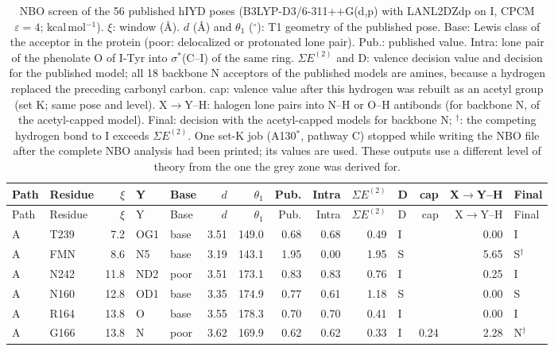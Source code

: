 \documentclass[journal=jcisd8,manuscript=suppinfo]{achemso}
\begin{document}
\begin{singlespace}
{\scriptsize
\setlength{\tabcolsep}{3pt}
\begin{longtable}{llrllrrrrrlrrl}
\caption{NBO screen of the 56 published hIYD poses (B3LYP-D3/6-311++G(d,p) with LANL2DZdp on I, CPCM $\varepsilon=4$; kcal\,mol$^{-1}$).\cite{Karmakar2026} $\xi$: window (\AA). $d$ (\AA) and $\theta_1$ ($^\circ$): T1 geometry of the published pose. Base: Lewis class of the acceptor in the protein (poor: delocalized or protonated lone pair). Pub.: published value. Intra: lone pair of the phenolate O of I-Tyr into $\sigma^*$(C--I) of the same ring. $\Sigma E^{(2)}$ and D: valence decision value and decision for the published model; all 18 backbone N acceptors of the published models are amines, because a hydrogen replaced the preceding carbonyl carbon. cap: valence value after this hydrogen was rebuilt as an acetyl group (set K; same pose and level). X$\to$Y--H: halogen lone pairs into N--H or O--H antibonds (for backbone N, of the acetyl-capped model). Final: decision with the acetyl-capped models for backbone N; $^\dagger$: the competing hydrogen bond to I exceeds $\Sigma E^{(2)}$. One set-K job (A130$^*$, pathway C) stopped while writing the NBO file after the complete NBO analysis had been printed; its values are used. These outputs use a different level of theory from the one the grey zone was derived for.}\label{tab:hiydnbo}\\
\toprule
Path & Residue & $\xi$ & Y & Base & $d$ & $\theta_1$ & Pub. & Intra & $\Sigma E^{(2)}$ & D & cap & X$\to$Y--H & Final\\
\midrule
\endfirsthead
\toprule
Path & Residue & $\xi$ & Y & Base & $d$ & $\theta_1$ & Pub. & Intra & $\Sigma E^{(2)}$ & D & cap & X$\to$Y--H & Final\\
\midrule
\endhead
\bottomrule
\endlastfoot
A & T239 & 7.2 & OG1 & base & 3.51 & 149.0 & 0.68 & 0.68 & 0.49 & I &  & 0.00 & I\\
A & FMN & 8.6 & N5 & base & 3.19 & 143.1 & 1.95 & 0.00 & 1.95 & S &  & 5.65 & S$^\dagger$\\
A & N242 & 11.8 & ND2 & poor & 3.51 & 173.1 & 0.83 & 0.83 & 0.76 & I &  & 0.25 & I\\
A & N160 & 12.8 & OD1 & base & 3.35 & 174.9 & 0.77 & 0.61 & 1.18 & S &  & 0.00 & S\\
A & R164 & 13.8 & O & base & 3.55 & 178.3 & 0.70 & 0.70 & 0.41 & I &  & 0.00 & I\\
A & G166 & 13.8 & N & poor & 3.62 & 169.9 & 0.62 & 0.62 & 0.33 & I & 0.24 & 2.28 & N$^\dagger$\\

\end{longtable}}
\end{singlespace}
\end{document}
